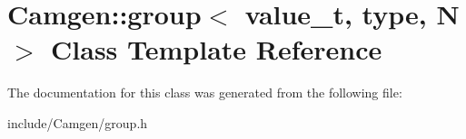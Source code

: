 \hypertarget{a00252}{\section{Camgen\-:\-:group$<$ value\-\_\-t, type, N $>$ Class Template Reference}
\label{a00252}
}


The documentation for this class was generated from the following file\-:\begin{DoxyCompactItemize}
\item 
include/\-Camgen/group.\-h\end{DoxyCompactItemize}
